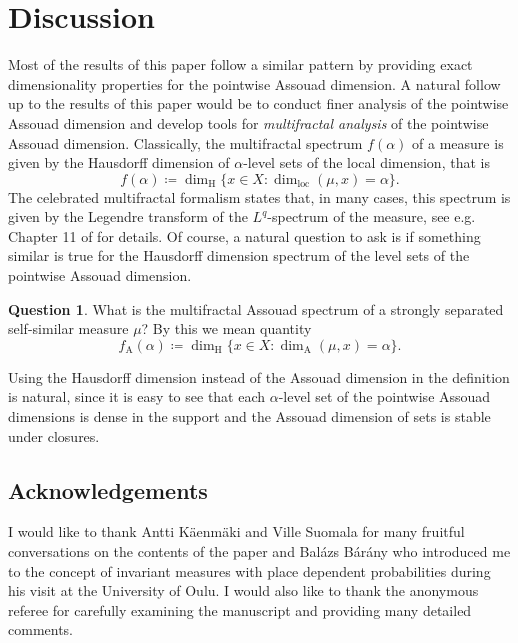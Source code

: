 \documentclass{PRM}
\newcommand{\adim}{\dim_{\mathrm{A}}}
\theoremstyle{plain}
\theoremstyle{definition}
\newtheorem{quest}{Question}
\theoremstyle{remark}
\begin{document}
\section{Discussion}
Most of the results of this paper follow a similar pattern by providing exact dimensionality properties for the pointwise Assouad dimension. A natural follow up to the results of this paper would be to conduct finer analysis of the pointwise Assouad dimension and develop tools for \emph{multifractal analysis} of the pointwise Assouad dimension. Classically, the multifractal spectrum $f(\alpha)$ of a measure is given by the Hausdorff dimension of $\alpha$-level sets of the local dimension, that is 
\begin{equation*}
    f(\alpha)\coloneqq \dim_{\mathrm{H}}\{x\in X\colon \dim_{\mathrm{loc}}(\mu,x)=\alpha\}.
\end{equation*}
The celebrated multifractal formalism states that, in many cases, this spectrum is given by the Legendre transform of the $L^q$-spectrum of the measure, see e.g. Chapter 11 of \cite{Falc1} for details. Of course, a natural question to ask is if something similar is true for the Hausdorff dimension spectrum of the level sets of the pointwise Assouad dimension.

\begin{quest}
What is the multifractal Assouad spectrum of a strongly separated self-similar measure $\mu$? By this we mean quantity
\begin{equation*}
     f_{\mathrm{A}}(\alpha)\coloneqq \dim_{\mathrm{H}}\{x\in X\colon \adim(\mu,x)=\alpha\}.
\end{equation*}
\end{quest}
Using the Hausdorff dimension instead of the Assouad dimension in the definition is natural, since it is easy to see that each $\alpha$-level set of the pointwise Assouad dimensions is dense in the support and the Assouad dimension of sets is stable under closures.

\subsection*{Acknowledgements}
I would like to thank Antti Käenmäki and Ville Suomala for many fruitful conversations on the contents of the paper and Balázs Bárány who introduced me to the concept of invariant measures with place dependent probabilities during his visit at the University of Oulu. I would also like to thank the anonymous referee for carefully examining the manuscript and providing many detailed comments.



\end{document}

